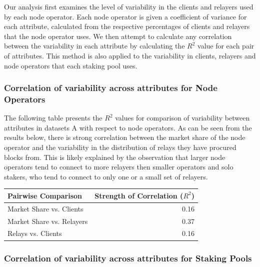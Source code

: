 \documentclass[conference]{IEEEtran}
\begin{document}
Our analysis first examines the level of variability in the clients and relayers used by each node operator.  Each node operator is given a coefficient of variance for each attribute, calculated from the respective percentages of clients and relayers that the node operator uses. We then attempt to calculate any correlation between the variability in each attribute by calculating the $R^2$ value for each pair of attributes.  This method is also applied to the variability in clients, relayers and node operators that each staking pool uses.

\subsubsection{Correlation of variability across attributes for Node Operators}

The following table presents the $R^2$ values for comparison of variability between attributes in datasets A with respect to node operators. As can be seen from the results below, there is strong correlation between the market share of the node operator and the variability in the distribution of relays they have procured blocks from. This is likely explained by the observation that larger node operators tend to connect to more relayers then smaller operators and solo stakers, who tend to connect to only one or a small set of relayers.

\begin{table}[htbp]
    \centering
    \normalsize
    \begin{tabular}{p{3.9cm}r}
        \toprule
        Pairwise Comparison & Strength of Correlation ($R^2$) \\
        \midrule
        Market Share vs. Clients & 0.16 \\
        Market Share vs. Relayers & 0.37 \\
        Relays vs. Clients & 0.16 \\
        \bottomrule
    \end{tabular}
\end{table}

\subsubsection{Correlation of variability across attributes for Staking Pools}
\end{document}
